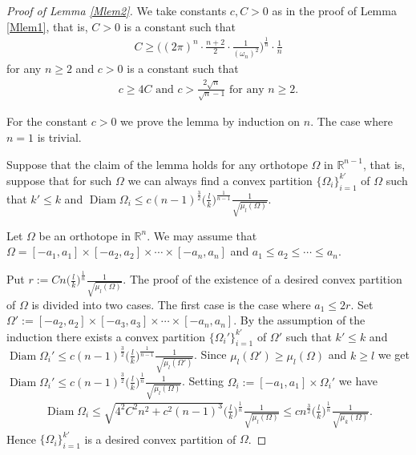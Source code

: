 \documentclass[12pt]{amsart}
\theoremstyle{plain}
\theoremstyle{remark}
\newcommand{\diam}{\operatorname{Diam}}
\begin{document}
\begin{proof}[Proof of Lemma \ref{Mlem2}]
We take constants $c,C>0$ as in the proof of Lemma \ref{Mlem1}, that is, $C>0$ is a constant such that 
    \begin{align*}
         C\geq \Big((2\pi)^n\cdot \frac{n+2}{2} \cdot \frac{1}{(\omega_n)^2}\Big)^{\frac{1}{n}}\cdot \frac{1}{n}
    \end{align*}for any $n\geq 2$ and $c>0$ is a constant such that
    \begin{align*}
        c\geq 4C \text{ and }c>\frac{2\sqrt{n}}{\sqrt{n}-1} \text{ for any }n\geq 2.
    \end{align*}
    
For the constant $c>0$ we prove the lemma by induction on $n$. The case where $n=1$ is trivial.

Suppose that the claim of the lemma holds for any orthotope $\Omega$ in $\mathbb{R}^{n-1}$, that is, suppose that for such $\Omega$ we can always find a convex partition $\{\Omega_i\}_{i=1}^{k'}$ of $\Omega$ such that $k'\leq k$ and $\diam \Omega_i\leq c(n-1)^{\frac{3}{2}}\big(\frac{l}{k}\big)^{\frac{1}{n-1}}\frac{1}{\sqrt{\mu_l(\Omega)}}$.

Let $\Omega$ be an orthotope in $\mathbb{R}^n$. We may assume that $\Omega=[-a_1,a_1]\times [-a_2,a_2]\times \cdots \times [-a_n,a_n]$ and $a_1\leq a_2\leq \cdots \leq a_n$. 

Put $r:=Cn \big(\frac{l}{k}\big)^{\frac{1}{n}}\frac{1}{\sqrt{\mu_l(\Omega)}}$. The proof of the existence of a desired convex partition of $\Omega$ is divided into two cases. The first case is the case where $a_1\leq 2r$. Set $\Omega':=[-a_2,a_2]\times [-a_3,a_3]\times \cdots \times [-a_n,a_n]$. By the assumption of the induction there exists a convex partition $\{\Omega_i'\}_{i=1}^{k'}$ of $\Omega'$ such that $k'\leq k$ and $\diam \Omega_i'\leq c(n-1)^{\frac{3}{2}}\big(\frac{l}{k}\big)^{\frac{1}{n-1}}\frac{1}{\sqrt{\mu_l(\Omega')}}$. Since $\mu_l(\Omega')\geq \mu_l(\Omega)$ and $k\geq l$ we get $\diam \Omega_i'\leq c(n-1)^{\frac{3}{2}}\big(\frac{l}{k}\big)^{\frac{1}{n}}\frac{1}{\sqrt{\mu_l(\Omega)}}$. Setting $\Omega_i:=[-a_1,a_1]\times \Omega_i'$ we have 
    \begin{align*}
        \diam \Omega_i\leq \sqrt{4^2C^2n^2+c^2(n-1)^3}\Big(\frac{l}{k}\Big)^{\frac{1}{n}}\frac{1}{\sqrt{\mu_l(\Omega)}}\leq cn^{\frac{3}{2}}\Big(\frac{l}{k}\Big)^{\frac{1}{n}}\frac{1}{\sqrt{\mu_k(\Omega)}}.
    \end{align*}Hence $\{\Omega_i\}_{i=1}^{k'}$ is a desired convex partition of $\Omega$.


\end{proof}
\end{document}
